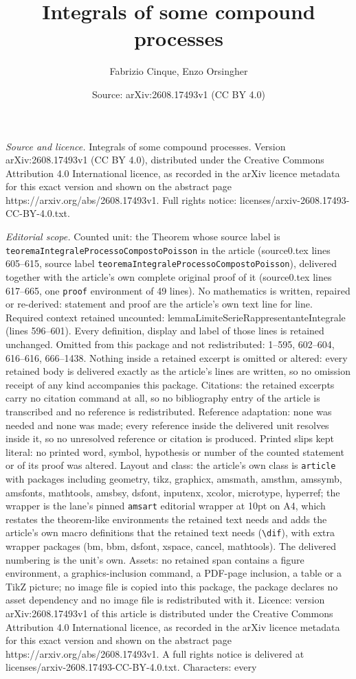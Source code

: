 \documentclass[10pt,a4paper]{amsart}
\title[Integrals of some compound processes]{Integrals of some compound processes}
\author{Fabrizio Cinque, Enzo Orsingher}
\date{Source: arXiv:2608.17493v1 (CC BY 4.0)}
\begin{document}
\maketitle

\noindent\emph{Source and licence.} Integrals of some compound processes. Version arXiv:2608.17493v1 (CC BY 4.0), distributed under the Creative Commons Attribution 4.0 International licence, as recorded in the arXiv licence metadata for this exact version and shown on the abstract page https://arxiv.org/abs/2608.17493v1. Full rights notice: licenses/arxiv-2608.17493-CC-BY-4.0.txt.\par\smallskip

\noindent\textit{Editorial scope.} Counted unit: the Theorem whose source label is \texttt{teoremaIntegraleProcessoCompostoPoisson} in the article (source0.tex lines 605--615, source label \texttt{teoremaIntegraleProcessoCompostoPoisson}), delivered together with the article's own complete original proof of it (source0.tex lines 617--665, one \texttt{proof} environment of 49 lines). No mathematics is written, repaired or re-derived: statement and proof are the article's own text line for line. Required context retained uncounted: lemmaLimiteSerieRappresentanteIntegrale (lines 596--601). Every definition, display and label of those lines is retained unchanged. Omitted from this package and not redistributed: 1--595, 602--604, 616--616, 666--1438. Nothing inside a retained excerpt is omitted or altered: every retained body is delivered exactly as the article's lines are written, so no omission receipt of any kind accompanies this package. Citations: the retained excerpts carry no citation command at all, so no bibliography entry of the article is transcribed and no reference is redistributed. Reference adaptation: none was needed and none was made; every reference inside the delivered unit resolves inside it, so no unresolved reference or citation is produced. Printed slips kept literal: no printed word, symbol, hypothesis or number of the counted statement or of its proof was altered. Layout and class: the article's own class is \texttt{article} with packages including geometry, tikz, graphicx, amsmath, amsthm, amssymb, amsfonts, mathtools, amsbsy, dsfont, inputenx, xcolor, microtype, hyperref; the wrapper is the lane's pinned \texttt{amsart} editorial wrapper at 10pt on A4, which restates the theorem-like environments the retained text needs and adds the article's own macro definitions that the retained text needs (\texttt{\textbackslash dif}), with extra wrapper packages (bm, bbm, dsfont, xspace, cancel, mathtools). The delivered numbering is the unit's own. Assets: no retained span contains a figure environment, a graphics-inclusion command, a PDF-page inclusion, a table or a TikZ picture; no image file is copied into this package, the package declares no asset dependency and no image file is redistributed with it. Licence: version arXiv:2608.17493v1 of this article is distributed under the Creative Commons Attribution 4.0 International licence, as recorded in the arXiv licence metadata for this exact version and shown on the abstract page https://arxiv.org/abs/2608.17493v1. A full rights notice is delivered at licenses/arxiv-2608.17493-CC-BY-4.0.txt. Characters: every 
\end{document}
